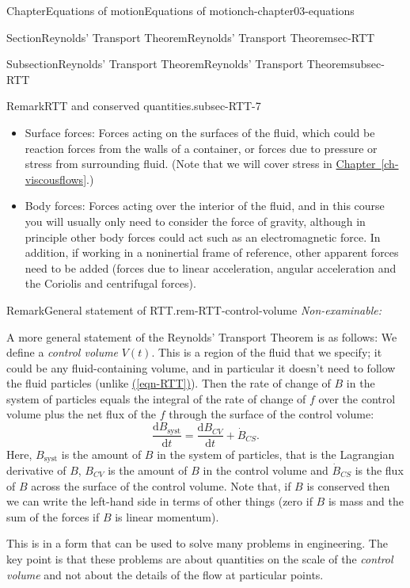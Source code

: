 \documentclass[oneside,10pt,]{book}
\newcommand{\xreffont}{\relax}
\numberwithin{equation}{section}
\newcommand{\de}{\mathrm{d}}
\newcommand{\dd}[2]{\frac{\de#1}{\de#2}}
\begin{document}
\begin{chapterptx}{Chapter}{Equations of motion}{}{Equations of motion}{}{}{ch-chapter03-equations}
\begin{sectionptx}{Section}{Reynolds' Transport Theorem}{}{Reynolds' Transport Theorem}{}{}{sec-RTT}
\begin{subsectionptx}{Subsection}{Reynolds' Transport Theorem}{}{Reynolds' Transport Theorem}{}{}{subsec-RTT}
\begin{remark}{Remark}{RTT and conserved quantities.}{subsec-RTT-7}
\begin{itemize}[label=\textbullet]
\begin{itemize}[label=$\circ$]
\item{}Surface forces: Forces acting on the surfaces of the fluid, which could be reaction forces from the walls of a container, or forces due to pressure or stress from surrounding fluid. (Note that we will cover stress in \hyperref[ch-viscousflows]{Chapter~{\xreffont\ref{ch-viscousflows}}}.)%
\item{}Body forces: Forces acting over the interior of the fluid, and in this course you will usually only need to consider the force of gravity, although in principle other body forces could act such as an electromagnetic force. In addition, if working in a noninertial frame of reference, other apparent forces need to be added (forces due to linear acceleration, angular acceleration and the Coriolis and centrifugal forces).%
\end{itemize}
%
\end{itemize}
%
\end{remark}
\begin{remark}{Remark}{General statement of RTT.}{rem-RTT-control-volume}%
\emph{Non-examinable:}%
\par
A more general statement of the Reynolds' Transport Theorem is as follows: We define a \emph{control volume} \(V(t)\). This is a region of the fluid that we specify; it could be any fluid-containing volume, and in particular it doesn't need to follow the fluid particles (unlike \hyperref[eqn-RTT]{({\xreffont\ref{eqn-RTT}})}). Then the rate of change of \(B\) in the system of particles equals the integral of the rate of change of \(f\) over the control volume plus the net flux of the \(f\) through the surface of the control volume:%
\begin{equation}
\dd{B_{\textrm{syst}}}{t} = \dd{B_{CV}}{t}+\dot{B}_{CS}.\label{eqn-RTT-simp}
\end{equation}
Here, \(B_{\textrm{syst}}\) is the amount of \(B\) in the system of particles, that is the Lagrangian derivative of \(B\), \(B_{CV}\) is the amount of \(B\) in the control volume and \(\dot{B}_{CS}\) is the flux of \(B\) across the surface of the control volume. Note that, if \(B\) is conserved then we can write the left-hand side in terms of other things (zero if \(B\) is mass and the sum of the forces if \(B\) is linear momentum).%
\par
This is in a form that can be used to solve many problems in engineering. The key point is that these problems are about quantities on the scale of the \emph{control volume} and not about the details of the flow at particular points.%

\end{remark}
\end{subsectionptx}
\end{sectionptx}
\end{chapterptx}
\end{document}
